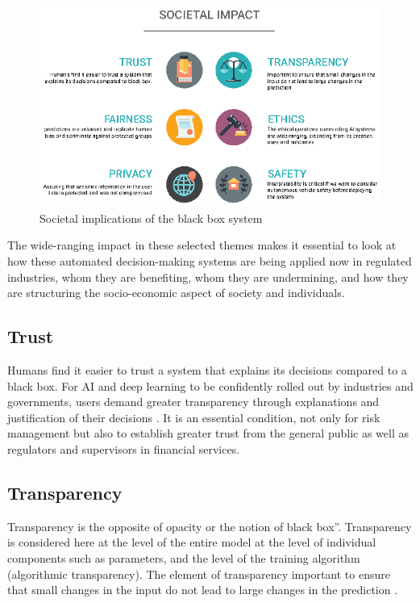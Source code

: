 \begin{figure}[htbp]
\centering
\includegraphics[width=1\textwidth]{images/societal-impact-copy.eps}
\caption{Societal implications of the black box system}
\label{fig:societal-impacts}
\end{figure}

The wide-ranging impact in these selected themes makes it essential to look at how these automated decision-making systems are being applied now in regulated industries, whom they are benefiting, whom they are undermining, and how they are structuring the socio-economic aspect of society and individuals\cite{ainow2016report}.

\subsection{Trust}

Humans find it easier to trust a system that explains its decisions compared to a black box. For AI and deep learning to be confidently rolled out by industries and governments, users demand greater transparency through explanations and justification of their decisions \cite{molnar}. It is an essential condition, not only for risk management but also to establish greater trust from the general public as well as regulators and supervisors in financial services.


\subsection{Transparency}

Transparency is the opposite of opacity or the notion of black box”. Transparency is considered here at the level of the entire model at the level of individual components such as parameters, and the level of the training algorithm (algorithmic transparency). The element of transparency important to ensure that small changes in the input do not lead to large changes in the prediction \cite{molnar}.


